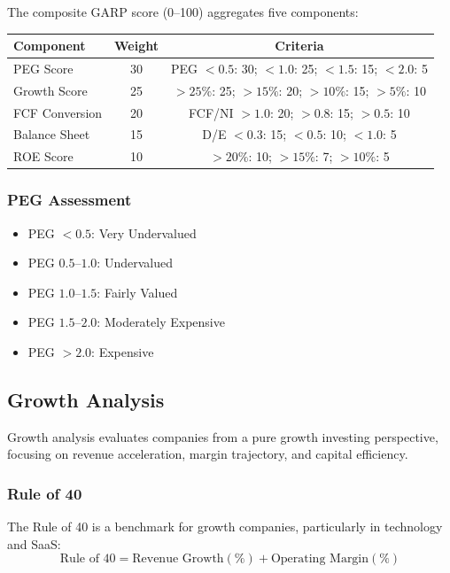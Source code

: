 The composite GARP score (0--100) aggregates five components:

\begin{center}
\begin{tabular}{lcc}
\textbf{Component} & \textbf{Weight} & \textbf{Criteria} \\
\hline
PEG Score & 30 & PEG $< 0.5$: 30; $< 1.0$: 25; $< 1.5$: 15; $< 2.0$: 5 \\
Growth Score & 25 & $> 25\%$: 25; $> 15\%$: 20; $> 10\%$: 15; $> 5\%$: 10 \\
FCF Conversion & 20 & FCF/NI $> 1.0$: 20; $> 0.8$: 15; $> 0.5$: 10 \\
Balance Sheet & 15 & D/E $< 0.3$: 15; $< 0.5$: 10; $< 1.0$: 5 \\
ROE Score & 10 & $> 20\%$: 10; $> 15\%$: 7; $> 10\%$: 5 \\
\end{tabular}
\end{center}

\subsubsection{PEG Assessment}

\begin{itemize}
  \item[] PEG $< 0.5$: Very Undervalued
  \item[] PEG $0.5$--$1.0$: Undervalued
  \item[] PEG $1.0$--$1.5$: Fairly Valued
  \item[] PEG $1.5$--$2.0$: Moderately Expensive
  \item[] PEG $> 2.0$: Expensive
\end{itemize}

\newpage\subsection{Growth Analysis}

Growth analysis evaluates companies from a pure growth investing perspective, focusing on revenue acceleration, margin trajectory, and capital efficiency.

\subsubsection{Rule of 40}

The Rule of 40 is a benchmark for growth companies, particularly in technology and SaaS:
\[
\text{Rule of 40} = \text{Revenue Growth}(\%) + \text{Operating Margin}(\%)
\]


